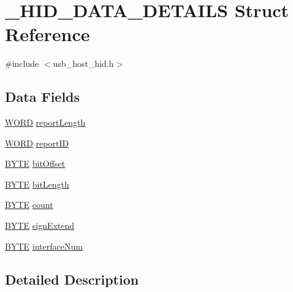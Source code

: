 \hypertarget{struct___h_i_d___d_a_t_a___d_e_t_a_i_l_s}{}\section{\+\_\+\+H\+I\+D\+\_\+\+D\+A\+T\+A\+\_\+\+D\+E\+T\+A\+I\+L\+S Struct Reference}
\label{struct___h_i_d___d_a_t_a___d_e_t_a_i_l_s}


{\ttfamily \#include $<$usb\+\_\+host\+\_\+hid.\+h$>$}

\subsection*{Data Fields}
\begin{DoxyCompactItemize}
\item 
\hyperlink{_generic_type_defs_8h_a2b0e863dadf920709ec53d9088ee7c91}{W\+O\+R\+D} \hyperlink{struct___h_i_d___d_a_t_a___d_e_t_a_i_l_s_a92a0db59fa5963a90b0cddd2e9f72ce6}{report\+Length}
\item 
\hyperlink{_generic_type_defs_8h_a2b0e863dadf920709ec53d9088ee7c91}{W\+O\+R\+D} \hyperlink{struct___h_i_d___d_a_t_a___d_e_t_a_i_l_s_aebdb6c1d16fff393bae351f5b2c4dabc}{report\+I\+D}
\item 
\hyperlink{_generic_type_defs_8h_a4ae1dab0fb4b072a66584546209e7d58}{B\+Y\+T\+E} \hyperlink{struct___h_i_d___d_a_t_a___d_e_t_a_i_l_s_a8dd4758b1c7da6db70b382f0e6c424a2}{bit\+Offset}
\item 
\hyperlink{_generic_type_defs_8h_a4ae1dab0fb4b072a66584546209e7d58}{B\+Y\+T\+E} \hyperlink{struct___h_i_d___d_a_t_a___d_e_t_a_i_l_s_a3b704b6d19626374963a90f3f2f7b4d1}{bit\+Length}
\item 
\hyperlink{_generic_type_defs_8h_a4ae1dab0fb4b072a66584546209e7d58}{B\+Y\+T\+E} \hyperlink{struct___h_i_d___d_a_t_a___d_e_t_a_i_l_s_a8f68284f43d151dc96b2057658cd4b8a}{count}
\item 
\hyperlink{_generic_type_defs_8h_a4ae1dab0fb4b072a66584546209e7d58}{B\+Y\+T\+E} \hyperlink{struct___h_i_d___d_a_t_a___d_e_t_a_i_l_s_a1b394dd5481c225f2232a7ac343367af}{sign\+Extend}
\item 
\hyperlink{_generic_type_defs_8h_a4ae1dab0fb4b072a66584546209e7d58}{B\+Y\+T\+E} \hyperlink{struct___h_i_d___d_a_t_a___d_e_t_a_i_l_s_a04971351adcb65ce1dd649d445c4c414}{interface\+Num}
\end{DoxyCompactItemize}


\subsection{Detailed Description}


